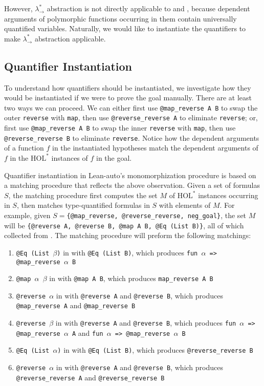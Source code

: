 However, $\lambda_\to^*$ abstraction is not directly applicable to \vmaprev and
\vrevrev, because dependent arguments of polymorphic functions occurring in them contain
universally quantified variables. Naturally, we would like to instantiate the quantifiers to make $\lambda_\to^*$
abstraction applicable.

\subsection{Quantifier Instantiation} \label{exinst}

To understand how quantifiers should be instantiated, we investigate how they would
be instantiated if we were to prove the goal manually. There are at least two ways we can proceed. We can
either first use \texttt{@map\_reverse A B} to swap the outer \texttt{reverse} with \texttt{map}, then
use \texttt{@reverse\_reverse A} to eliminate \texttt{reverse}; or, first use
\texttt{@map\_reverse A B} to swap the inner \texttt{reverse} with \texttt{map}, then
use \texttt{@reverse\_reverse B} to eliminate \texttt{reverse}. Notice how the dependent
arguments of a function $f$ in the instantiated hypotheses match the dependent
arguments of $f$ in the $\text{HOL}^*$ instances of $f$ in the goal.

Quantifier instantiation in Lean-auto's monomorphization procedure is based
on a matching procedure that reflects the above observation. Given a set of formulas $S$,
the matching procedure first computes the set $M$ of $\text{HOL}^*$ instances occurring
in $S$, then matches type-quantified formulas in $S$ with elements of $M$. For example,
given $S=$\texttt{\{@map\_reverse, @reverse\_reverse, neg\_goal\}}, the set $M$ will be
\texttt{\{@reverse A, @reverse B, @map A B, @Eq (List B)\}}, all of which collected from \vneggoal.
The matching procedure will preform the following matchings:

\begin{enumerate}
  \item \texttt{@Eq (List $\beta$)} in \vmaprev with \texttt{@Eq (List B)},
    which produces \texttt{fun $\alpha$ => @map\_reverse $\alpha$ B}
  \item \texttt{@map $\alpha$ $\beta$} in \vmaprev with \texttt{@map A B},
    which produces \texttt{map\_reverse A B}
  \item \texttt{@reverse $\alpha$} in \vmaprev with \texttt{@reverse A} and \texttt{@reverse B},
    which produces \texttt{@map\_reverse A} and \texttt{@map\_reverse B}
  \item \texttt{@reverse $\beta$} in \vmaprev with \texttt{@reverse A} and \texttt{@reverse B},
    which produces \texttt{fun $\alpha$ => @map\_reverse $\alpha$ A} and \texttt{fun $\alpha$ => @map\_reverse $\alpha$ B}
  \item \texttt{@Eq (List $\alpha$)} in \vrevrev with \texttt{@Eq (List B)},
    which produces \texttt{@reverse\_reverse B}
  \item \texttt{@reverse $\alpha$} in \vrevrev with \texttt{@reverse A} and \texttt{@reverse B},
    which produces \texttt{@reverse\_reverse A} and \texttt{@reverse\_reverse B}
\end{enumerate}

